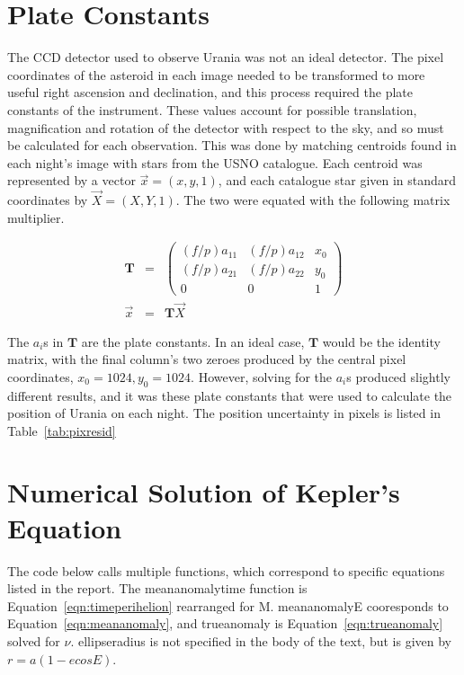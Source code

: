 \documentclass[a4paper,12pt]{article}
\begin{document}
\begin{appendices}
\section{Plate Constants}
\label{app:plate}

The CCD detector used to observe Urania was not an ideal detector. The pixel coordinates of the asteroid in each image needed to be transformed to more useful right ascension and declination, and this process required the plate constants of the instrument. These values account for possible translation, magnification and rotation of the detector with respect to the sky, and so must be calculated for each observation. This was done by matching centroids found in each night's image with stars from the USNO catalogue. Each centroid was represented by a vector $\vec{x} = (x,y,1)$, and each catalogue star given in standard coordinates by $\vec{X} = (X,Y,1)$. The two were equated with the following matrix multiplier.

\begin{eqnarray}
\mathbf{T} &=& \begin{pmatrix}
(f/p)a_{11}& (f/p)a_{12}& x_{0}\\
(f/p)a_{21}& (f/p)a_{22}& y_{0}\\
0& 0& 1
\end{pmatrix}\nonumber\\
\vec{x} &=& \mathbf{T}\vec{X}\nonumber
\label{eqn:transform}
\end{eqnarray}

The $a_{i}$s in $\mathbf{T}$ are the plate constants. In an ideal case, $\mathbf{T}$ would be the identity matrix, with the final column's two zeroes produced by the central pixel coordinates, $x_{0} = 1024, y_{0} = 1024$. However, solving for the $a_{i}$s produced slightly different results, and it was these plate constants that were used to calculate the position of Urania on each night. The position uncertainty in pixels is listed in Table~\ref{tab:pixresid}

\section{Numerical Solution of Kepler's Equation}

The code below calls multiple functions, which correspond to specific equations listed in the report. The meananomalytime function is Equation~\ref{eqn:timeperihelion} rearranged for M. meananomalyE cooresponds to Equation~\ref{eqn:meananomaly}, and trueanomaly is Equation~\ref{eqn:trueanomaly} solved for $\nu$. ellipseradius is not specified in the body of the text, but is given by $r=a(1-ecosE)$.


\end{appendices}
\end{document}
